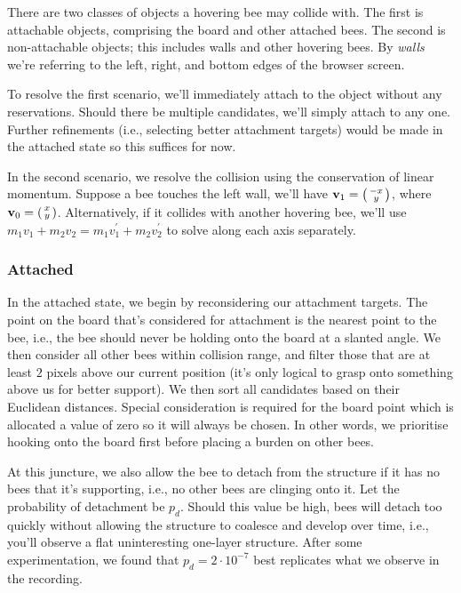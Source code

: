 \documentclass[a4paper,10pt]{article}
\begin{document}
\begin{multicols}{2}
    There are two classes of objects a hovering bee may collide with. The first is
    attachable objects, comprising the board and other attached bees. The second is
    non-attachable objects; this includes walls and other hovering bees. By \textit{walls}
    we're referring to the left, right, and bottom edges of the browser screen.

    To resolve the first scenario, we'll immediately attach to the object without any
    reservations. Should there be multiple candidates, we'll simply attach to any one.
    Further refinements (i.e., selecting better attachment targets) would be made in
    the attached state so this suffices for now.

    In the second scenario, we resolve the collision using the conservation of linear momentum.
    Suppose a bee touches the left wall, we'll have $\mathbf{v}_{1} = \begin{psmallmatrix} -x \\ y \end{psmallmatrix}$,
    where $\mathbf{v}_{0} = \begin{psmallmatrix} x \\ y \end{psmallmatrix}$. Alternatively, if
    it collides with another hovering bee, we'll use $m_{1}v_{1} + m_{2}v_{2} = m_{1}v_{1}^{\prime} + m_{2}v_{2}^{\prime}$
    to solve along each axis separately.

    \subsubsection{Attached}

    In the attached state, we begin by reconsidering our attachment targets. The point on the board
    that's considered for attachment is the nearest point to the bee, i.e., the bee should never
    be holding onto the board at a slanted angle. We then consider all other bees within collision
    range, and filter those that are at least $2$ pixels above our current position (it's only logical
    to grasp onto something above us for better support). We then sort all candidates based on
    their Euclidean distances. Special consideration is required for the board point which is allocated
    a value of zero so it will always be chosen. In other words, we prioritise hooking onto the board first
    before placing a burden on other bees.

    At this juncture, we also allow the bee to detach from the structure if it has no bees that it's
    supporting, i.e., no other bees are clinging onto it. Let the probability of detachment be
    $p_{d}$. Should this value be high, bees will detach too quickly without allowing the structure
    to coalesce and develop over time, i.e., you'll observe a flat uninteresting one-layer structure.
    After some experimentation, we found that $p_{d} = 2 \cdot 10^{-7}$ best replicates what we
    observe in the recording.


\end{multicols}
\end{document}
